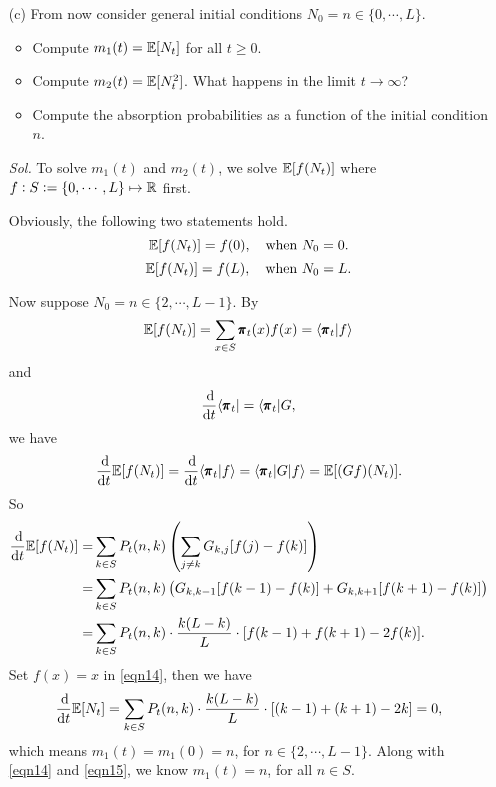 \begin{enumerate}
        \item[(c)] From now consider general initial conditions $N_0 = n \in \{0, \cdots, L \}$. 
        \begin{itemize}
            \item Compute $m_1(t) = \mathbb{E}[N_t]$ for all $t \ge 0$.
            \item Compute $m_2(t) = \mathbb{E}[N_t^2]$. What happens in the limit $t \to \infty$?
            \item Compute the absorption probabilities as a function of the initial condition $n$.
        \end{itemize} 

        \textit{ Sol. } To solve $m_1(t)$ and $m_2(t)$, we solve $\mathbb{E} [f(N_t)]$ where $f: S := \{0, \cdots, L\} \mapsto \mathbb{R}$ first. 
        
        Obviously, the following two statements hold.
        \begin{equation}\label{eqn14}
            \mathbb{E}[f(N_t)] = f(0),\quad \text{when } N_0 = 0.
        \end{equation}
        \begin{equation}\label{eqn15}
            \mathbb{E} [f(N_t)] = f(L), \quad \text{when } N_0 = L.
        \end{equation}

        Now suppose $N_0 = n \in \{2, \cdots, L-1\}$.
        By $$\mathbb{E} [f(N_t)] = \sum_{x \in S} \pmb{\pi}_t(x) f(x) = \langle \pmb{\pi}_t | f \rangle$$ and $$\frac{\dif}{\dif t} \langle \mbf{\pi}_t | = \langle \mbf{\pi}_t | G,$$ 
        we have 
        $$
        \frac{\dif}{\dif t} \mbb{E} [f(N_t)] = \frac{\dif}{\dif t} \langle \mbf{\pi}_t | f \rangle = \langle \mbf{\pi}_t | G | f \rangle = \mbb{E} [ (Gf)(N_t)].$$
        So 
        \begin{align} \label{eqn16}
            \frac{\dif}{\dif t} \mbb{E} [f(N_t)] = & \sum_{k \in S} P_t(n, k) \left( \sum_{j \neq k} G_{k, j}[f(j) - f(k)]\right)  \notag \\ 
            = &  \sum_{k \in S} P_t(n, k) \left(G_{k, k-1} [f(k-1) - f(k)] + G_{k, k+1} [f(k+1) - f(k)] \right) \notag \\ 
            = & \sum_{k \in S} P_t(n, k) \cdot \frac{k(L-k)}{L} \cdot [f(k-1) + f(k+1) - 2f(k)].
        \end{align}
        Set $f(x) = x$ in \eqref{eqn14}, then we have 
        $$
        \frac{\dif}{\dif t} \mbb{E} [N_t] = \sum_{k \in S} P_t(n, k) \cdot \frac{k(L-k)}{L} \cdot [(k-1) + (k+1) - 2k] = 0,
        $$
        which means $m_1(t) = m_1(0) = n$, for $n \in \{2, \cdots, L-1\}$. Along with \eqref{eqn14} and \eqref{eqn15}, we know $m_1(t) = n$, for all $n \in S$.


\end{enumerate}
